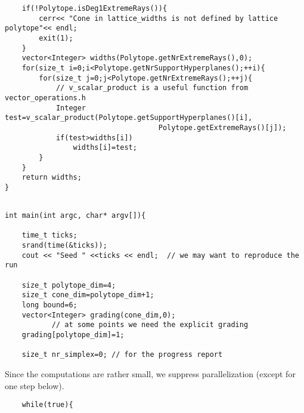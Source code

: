 \documentclass[12pt,a4paper]{scrartcl}
\theoremstyle{definition}
\begin{document}
\begin{small}
\begin{Verbatim}
    if(!Polytope.isDeg1ExtremeRays()){
        cerr<< "Cone in lattice_widths is not defined by lattice polytope"<< endl;
        exit(1);
    }
    vector<Integer> widths(Polytope.getNrExtremeRays(),0);
    for(size_t i=0;i<Polytope.getNrSupportHyperplanes();++i){
        for(size_t j=0;j<Polytope.getNrExtremeRays();++j){
            // v_scalar_product is a useful function from vector_operations.h
            Integer test=v_scalar_product(Polytope.getSupportHyperplanes()[i],
                                    Polytope.getExtremeRays()[j]);
            if(test>widths[i])
                widths[i]=test;
        }
    }
    return widths;    
}
\end{Verbatim}

\begin{Verbatim}

int main(int argc, char* argv[]){

    time_t ticks;
    srand(time(&ticks));
    cout << "Seed " <<ticks << endl;  // we may want to reproduce the run

    size_t polytope_dim=4;
    size_t cone_dim=polytope_dim+1;
    long bound=6;
    vector<Integer> grading(cone_dim,0); 
           // at some points we need the explicit grading
    grading[polytope_dim]=1;

    size_t nr_simplex=0; // for the progress report

\end{Verbatim}
Since the computations are rather small, we suppress parallelization (except for one step below).
\begin{Verbatim}	
    while(true){
    

\end{Verbatim}
\end{small}
\end{document}

